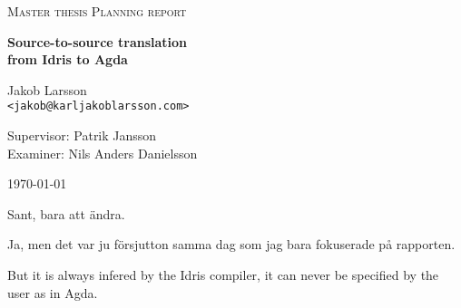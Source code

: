 \documentclass[parskip=half]{scrartcl}
\begin{document}
\begin{titlepage}

\centering
{\scshape\LARGE Master thesis Planning report}


\vspace{0.5cm}
{\huge\bfseries Source-to-source translation\\ from Idris to Agda
  }

\vspace{2cm}
{\Large Jakob Larsson\\}
\texttt{<jakob@karljakoblarsson.com>}

\vspace{1.0cm}
{\large Supervisor: Patrik Jansson  \\
        Examiner: Nils Anders Danielsson}

\vspace{1.5cm}

\vfill
{\large \today}

\end{titlepage}

%
%


Sant, bara att ändra.
%

Ja, men det var ju försjutton samma dag som jag bara fokuserade på rapporten.
%

But it is always infered by the Idris compiler, it can never be specified by
the user as in Agda.
\end{document}
